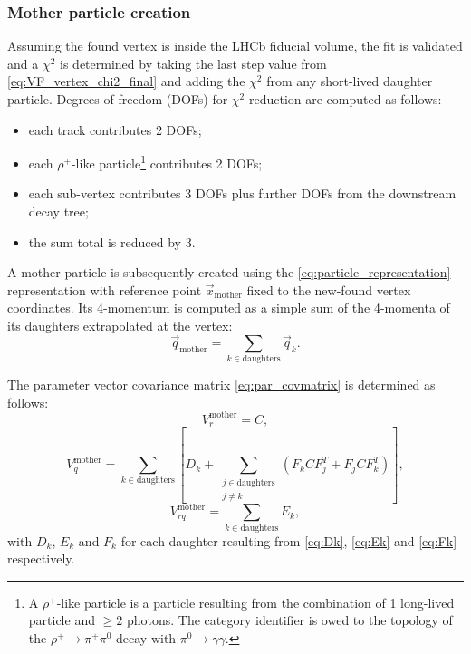 \subsubsection{Mother particle creation}
Assuming the found vertex is inside the LHCb fiducial volume, the fit is validated and a $\chi^2$ is determined by taking the last step value from \eqref{eq:VF_vertex_chi2_final} and adding the $\chi^2$ from any short-lived daughter particle.
Degrees of freedom (DOFs) for $\chi^2$ reduction are computed as follows:
\begin{itemize}
	\item each track contributes 2 DOFs;
	\item each $\rho^+$-like particle\footnote{A $\rho^+$-like particle is a particle resulting from the combination of 1 long-lived particle and $\geq 2$ photons. The category identifier is owed to the topology of the $\rho^+ \rightarrow \pi^+\pi^0$ decay with $\pi^0 \rightarrow \gamma \gamma$.} contributes 2 DOFs;
	\item each sub-vertex contributes 3 DOFs plus further DOFs from the downstream decay tree;
	\item the sum total is reduced by 3. %
\end{itemize}

A mother particle is subsequently created using the \eqref{eq:particle_representation} representation with reference point $\vec{x}_\text{mother}$ fixed to the new-found vertex coordinates.
Its 4-momentum is computed as a simple sum of the 4-momenta of its daughters extrapolated at the vertex:
\begin{equation}
	\vec{q}_\text{mother} = \sum_{k \in \text{daughters}} \vec{q}_k.
\end{equation}

The parameter vector covariance matrix \eqref{eq:par_covmatrix} is determined as follows:
\begin{equation}
	V_{r}^\text{mother} = C,
\end{equation}
\begin{equation}
	V_{q}^\text{mother} = \sum_{k \in \text{daughters}} \left[
		D_k
		+
		\sum_{\substack{j\in\text{daughters} \\ j \neq k}}
		\left(
			F_k C F_j^T + F_j C F_k^T
		\right)
	\right],
\end{equation}
\begin{equation}
	V_{rq}^\text{mother} = \sum_{k \in \text{daughters}} E_k,
\end{equation}
with $D_k$, $E_k$ and $F_k$ for each daughter resulting from \eqref{eq:Dk}, \eqref{eq:Ek} and \eqref{eq:Fk} respectively.

